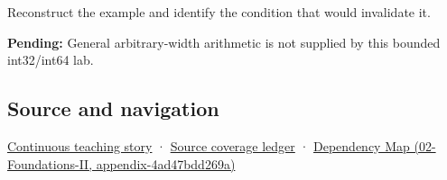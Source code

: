 Reconstruct the example and identify the condition that would invalidate it.

\textbf{Pending:} General arbitrary-width arithmetic is not supplied by this bounded int32/int64 lab.

\subsection{Source and navigation}\label{appendix-3333db47830f-source-and-navigation}

\hyperref[01-foundations-i-ch001-choosing-what-information-to-keep]{Continuous teaching story} · \hyperref[appendix-fd090d982a15]{Source coverage ledger} · \href{../02-Foundations-II/main.pdf\#nameddest=appendix-4ad47bdd269a}{Dependency Map (02-Foundations-II, appendix-4ad47bdd269a)}
